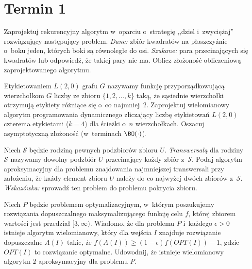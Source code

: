 \section{Termin 1}

\begin{zadanie}
	Zaprojektuj rekurencyjny algorytm w~oparciu o~strategię ,,dziel i~zwyciężaj''
	rozwiązujący następujący problem. \emph{Dane:} zbiór kwadratów na płaszczyźnie
	o~boku jeden, których boki są równoległe do osi. \emph{Szukane:} para
	przecinających się kwadratów lub odpowiedź, że takiej pary nie ma. Oblicz
	złożoność obliczeniową zaprojektowanego algorytmu.
\end{zadanie}

\begin{zadanie}
	Etykietowaniem $L(2,0)$ grafu $G$ nazywamy funkcję przyporządkowującą
	wierzchołkom $G$ liczby ze zbioru $\{1,2,\dots,k\}$ taką, że sąsiednie
	wierzchołki otrzymują etykiety różniące się o~co najmniej~$2$. Zaprojektuj
	wielomianowy algorytm programowania dynamicznego zliczający liczbę
	etykietowań $L(2,0)$ czterema etykietami ($k=4$) dla ścieżki o~$n$
	wierzchołkach. Oszacuj asymptotyczną złożoność (w~terminach $\BO(\cdot)$).
\end{zadanie}

\begin{zadanie}
	Niech $\mathcal{S}$ będzie rodziną pewnych podzbiorów zbioru $U$.
	\emph{Transwersalą} dla rodziny $\mathcal{S}$ nazywamy dowolny podzbiór $U$
	przecinający każdy zbiór z~$\mathcal{S}$. Podaj algorytm aproksymacyjny dla
	problemu znajdowania najmniejszej transwersali przy założeniu, że każdy
	element zbioru $U$ należy do co najwyżej dwóch zbiorów z~$\mathcal{S}$.
	\emph{Wskazówka:} sprowadź ten problem do problemu pokrycia zbioru.
\end{zadanie}

\begin{zadanie}
	Niech $P$ będzie problemem optymalizacyjnym, w~którym poszukujemy rozwiązania
	dopuszczalnego maksymalizującego funkcję celu $f$, której zbiorem wartości
	jest przedział $[3,\infty)$. Wiadomo, że dla problemu $P$ i~każdego
	$\epsilon>0$ istnieje algorytm wielomianowy, który dla wejścia $I$ znajduje
	rozwiązanie dopuszczalne $A(I)$ takie, że $f(A(I))\geq(1-\epsilon)f(OPT(I))-1$,
	gdzie $OPT(I)$ to rozwiązanie optymalne. Udowodnij, że istnieje wielomianowy
	algorytm $2$-aproksymacyjny dla problemu $P$.
\end{zadanie}

